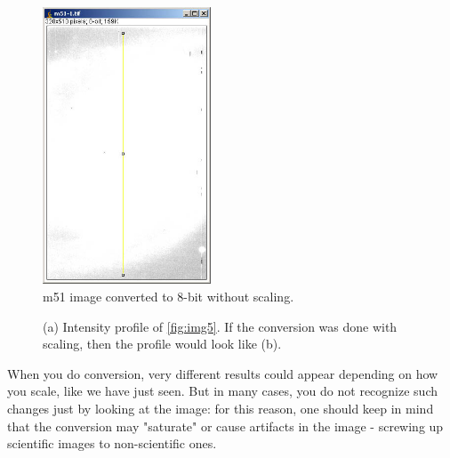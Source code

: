\begin{indentexercise}{1}
\begin{figure}[H]
\begin{center}
\includegraphics[width=5cm]{img/CMCIBasicCourse201102-img9.jpg}
\caption{ m51 image converted to 8-bit without scaling.}
\label{fig:img9}
\end{center}
\end{figure}

\begin{figure}[H]
\centering
{}
\caption{ (a) Intensity profile of \ref{fig:img5}. If the conversion was done with scaling, then the profile would look like (b). }
\label{fig:8bitConverted}
\end{figure} 

\end{indentexercise}

When you do conversion, very different results could appear depending on
how you scale, like we have just seen. But in many cases, you do not
recognize such changes just by looking at the image: for this reason,
one should keep in mind that the conversion may
"saturate" or cause artifacts in the image
- screwing up scientific images to non-scientific ones. 


